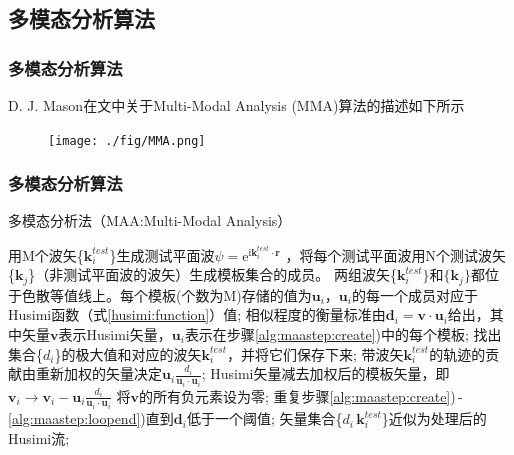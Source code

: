 \documentclass[UTF8]{beamer}
\begin{document}
\subsection{多模态分析算法}
\begin{frame}
	\frametitle{多模态分析算法}
	D. J. Mason在文中\cite{mason2012extending}\cite{mason2013quantum}关于Multi-Modal Analysis (MMA)算法的描述如下所示
	\begin{figure}
		\centering
		\texttt{[image: ./fig/MMA.png]}
	\end{figure}
\end{frame}
\begin{frame}
	\frametitle{多模态分析算法}
	\begin{algorithm}[H]
		\caption{多模态分析法（MAA:Multi-Modal Analysis）}
		\label{alg:maa}
		\begin{algorithmic}[1]
			\STATE 用M个波矢\{$\mathbf{k}^{test}_{i}$\}生成测试平面波$\psi=\mathrm{e}^{\mathrm{i}\mathbf{k}_i^{test}\cdot\mathbf{r}}$ ，将每个测试平面波用N个测试波矢\{$\mathbf{k}_j$\}（非测试平面波的波矢）生成模板集合的成员。
			两组波矢\{$\mathbf{k}_{i}^{test}\}$和$\{\mathbf{k}_{j}\}$都位于色散等值线上。每个模板(个数为M)存储的值为$\mathbf{u}_i$，$\mathbf{u}_i$的每一个成员对应于Husimi函数（式\ref{husimi:function}）值;
			\label{alg:maastep:create}
			\STATE 相似程度的衡量标准由$\mathbf{d}_i=\mathbf{v}\cdot\mathbf{u}_i$给出，其中矢量$\mathbf{v}$表示Husimi矢量，$\mathbf{u}_i$表示在步骤\ref{alg:maastep:create})中的每个模板;
			\STATE 找出集合\{$d_i$\}的极大值和对应的波矢$\mathbf{k}^{test}_i$，并将它们保存下来;
			\STATE 带波矢$\mathbf{k}^{test}_{i}$的轨迹的贡献由重新加权的矢量决定$\mathbf{u}_{i}\frac{d_{i}}{\mathbf{u}_{i}\cdot\mathbf{u}_{i}}$;
			\STATE Husimi矢量减去加权后的模板矢量，即$\mathbf{v}_{i}\rightarrow\mathbf{v}_{i}-\mathbf{u}_{i}\frac{d_{i}}{\mathbf{u}_{i}\cdot\mathbf{u}_{i}}$
			\STATE 将$\mathbf{v}$的所有负元素设为零;
			\label {alg:maastep:loopend}
			\STATE 重复步骤\ref{alg:maastep:create})\,-\,\ref{alg:maastep:loopend})直到$\mathbf{d}_{i}$低于一个阈值;
			\STATE 矢量集合\{$d_{i}\,\mathbf{k}^{test}_i$\}近似为处理后的Husimi流;
		\end{algorithmic}
	\end{algorithm}
\end{frame}
\end{document}
